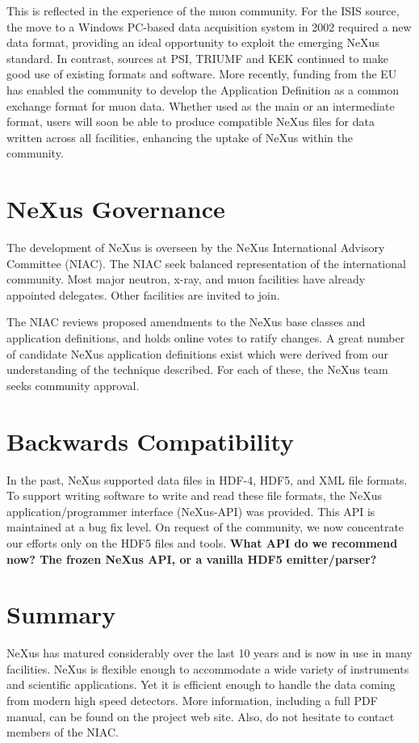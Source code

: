 \documentclass[%
 aip,
rsi,
 amsmath,amssymb,
 reprint,%
]{revtex4-1}
\begin{document}
This is reflected in the experience of the muon community. For the ISIS source, the move to a Windows PC-based data acquisition 
system in 2002 required a new data format, providing an ideal opportunity to exploit the emerging NeXus standard\cite{muon1}. In 
contrast, sources at PSI, TRIUMF and KEK continued to make good use of existing formats and software. More recently, funding 
from the EU has enabled the community to develop the Application Definition as a common exchange format for muon data\cite{muon2}. 
Whether used as the main or an intermediate format, users will soon be able to produce compatible NeXus files for data written 
across all facilities, enhancing the uptake of NeXus within the community.


\section{NeXus Governance}
  \label{sect_gov}

The development of NeXus is overseen
by the NeXus International Advisory Committee (NIAC).
The NIAC seek balanced representation of the international community.
Most major neutron, x-ray, and muon facilities have already appointed delegates.
Other facilities are invited to join.

The NIAC reviews proposed amendments to the NeXus base classes and
application definitions, and holds online votes to ratify changes.
A great number of candidate NeXus application definitions exist which were derived from our understanding of the technique described.
For each of these, the NeXus team seeks community approval. 


\section{Backwards Compatibility}

In the past, NeXus supported data files in HDF-4, HDF5, and XML file formats. 
To support writing software to write and read these file formats, the NeXus
application/programmer interface (NeXus-API) was provided.
This API is maintained at a bug fix level.
On request of the community, we now concentrate our efforts only
on the HDF5 files and tools.
\textbf{What API do we recommend now? The frozen NeXus API, or a vanilla HDF5 emitter/parser?}

\section{Summary}

NeXus has matured considerably over the last 10 years and is now in use in many facilities. NeXus 
is flexible enough to accommodate a wide variety of instruments and scientific applications. 
Yet it is efficient enough to 
handle the data coming from modern high speed detectors.
More information, including a full PDF manual, can be found on
  the project web site.\cite{nxwww}
Also, do not hesitate to contact members of the NIAC.


\nocite{*}
\end{document}
